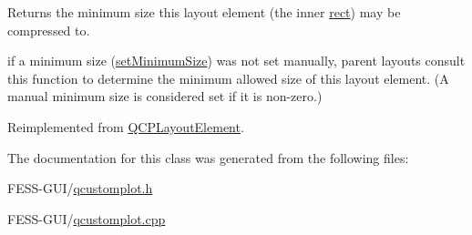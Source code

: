 Returns the minimum size this layout element (the inner \hyperlink{class_q_c_p_layout_element_a208effccfe2cca4a0eaf9393e60f2dd4}{rect}) may be compressed to.

if a minimum size (\hyperlink{class_q_c_p_layout_element_a5dd29a3c8bc88440c97c06b67be7886b}{set\+Minimum\+Size}) was not set manually, parent layouts consult this function to determine the minimum allowed size of this layout element. (A manual minimum size is considered set if it is non-\/zero.) 

Reimplemented from \hyperlink{class_q_c_p_layout_element_ab3fdb5c9a5189bb2dac10d4d25329cd8}{Q\+C\+P\+Layout\+Element}.



The documentation for this class was generated from the following files\+:\begin{DoxyCompactItemize}
\item 
F\+E\+S\+S-\/\+G\+U\+I/\hyperlink{qcustomplot_8h}{qcustomplot.\+h}\item 
F\+E\+S\+S-\/\+G\+U\+I/\hyperlink{qcustomplot_8cpp}{qcustomplot.\+cpp}\end{DoxyCompactItemize}
